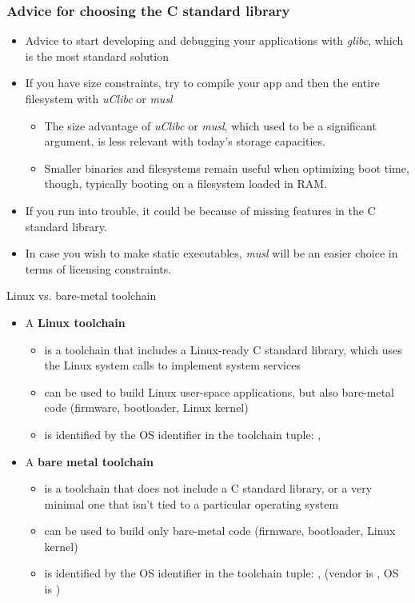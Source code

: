 \begin{frame}
  \frametitle{Advice for choosing the C standard library}
  \begin{itemize}
  \item Advice to start developing and debugging your applications
    with {\em glibc}, which is the most standard solution
  \item If you have size constraints, try to compile your app and then
    the entire filesystem with {\em uClibc} or {\em musl}
    \begin{itemize}
    \item The size advantage of {\em uClibc} or {\em musl}, which used
      to be a significant argument, is less relevant with today's
      storage capacities.
    \item Smaller binaries and filesystems remain useful when optimizing
      boot time, though, typically booting on a filesystem loaded in RAM.
    \end{itemize}
  \item If you run into trouble, it could be because of missing
    features in the C standard library.
  \item In case you wish to make static executables, {\em musl} will
    be an easier choice in terms of licensing constraints.
  \end{itemize}
\end{frame}

\begin{frame}{Linux vs. bare-metal toolchain}
  \begin{itemize}
  \item A {\bf Linux toolchain}
    \begin{itemize}
    \item is a toolchain that includes a Linux-ready C standard library, which
      uses the Linux system calls to implement system services
    \item can be used to build Linux user-space applications, but also
      bare-metal code (firmware, bootloader, Linux kernel)
    \item is identified by the  OS identifier in the
      toolchain tuple: ,
    \end{itemize}
  \item A {\bf bare metal toolchain}
    \begin{itemize}
    \item is a toolchain that does not include a C standard library, or a very
      minimal one that isn't tied to a particular operating
      system
    \item can be used to build only bare-metal code (firmware,
      bootloader, Linux kernel)
    \item is identified by the  OS identifier in the
      toolchain tuple: , 
      (vendor is , OS is )
    \end{itemize}
  \end{itemize}
\end{frame}

